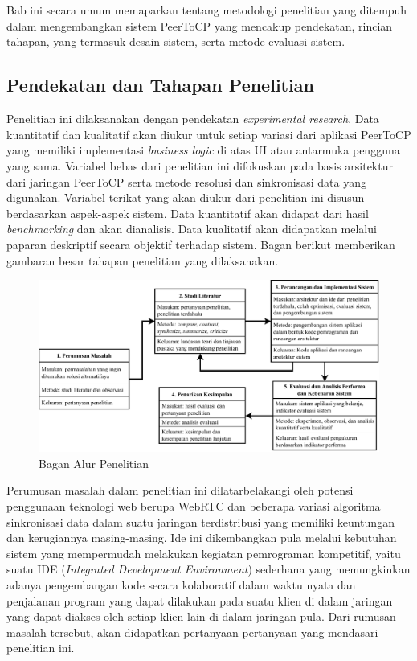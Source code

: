 \chapter{\babTiga}
\label{bab:3} 

Bab ini secara umum memaparkan tentang metodologi penelitian yang ditempuh dalam mengembangkan sistem PeerToCP yang mencakup pendekatan, rincian tahapan, yang termasuk desain sistem, serta metode evaluasi sistem.

\section{Pendekatan dan Tahapan Penelitian}

Penelitian ini dilaksanakan dengan pendekatan \textit{experimental research}. Data kuantitatif dan kualitatif akan diukur untuk setiap variasi dari aplikasi PeerToCP yang memiliki implementasi \textit{business logic} di atas UI atau antarmuka pengguna yang sama. Variabel bebas dari penelitian ini difokuskan pada basis arsitektur dari jaringan PeerToCP serta metode resolusi dan sinkronisasi data yang digunakan. Variabel terikat yang akan diukur dari penelitian ini disusun berdasarkan aspek-aspek sistem. Data kuantitatif akan didapat dari hasil \textit{benchmarking} dan akan dianalisis. Data kualitatif akan didapatkan melalui paparan deskriptif secara objektif terhadap sistem. Bagan berikut memberikan gambaran besar tahapan penelitian yang dilaksanakan.

\begin{figure}
    \centering
    \includegraphics[scale=0.7]{assets/skripsi/MetodePenelitian}
    \caption{Bagan Alur Penelitian}
    \label{bagan}
\end{figure}

Perumusan masalah dalam penelitian ini dilatarbelakangi oleh potensi penggunaan teknologi web berupa WebRTC dan beberapa variasi algoritma sinkronisasi data dalam suatu jaringan terdistribusi yang memiliki keuntungan dan kerugiannya masing-masing. Ide ini dikembangkan pula melalui kebutuhan sistem yang mempermudah melakukan kegiatan pemrograman kompetitif, yaitu suatu IDE (\textit{Integrated Development Environment}) sederhana yang memungkinkan adanya pengembangan kode secara kolaboratif dalam waktu nyata dan penjalanan program yang dapat dilakukan pada suatu klien di dalam jaringan yang dapat diakses oleh setiap klien lain di dalam jaringan pula. Dari rumusan masalah tersebut, akan didapatkan pertanyaan-pertanyaan yang mendasari penelitian ini.

